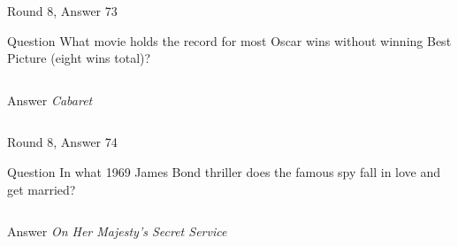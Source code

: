 \documentclass[11pt]{beamer}
\begin{document}
\begin{frame}[t]{Round 8, Answer 73}
\vspace{2em}
\begin{block}{Question}
What movie holds the record for most Oscar wins without winning Best Picture (eight wins total)?
\end{block}
\pause{}
\begin{columns}[T,totalwidth=\linewidth]
\begin{column}{0.35\linewidth}
\begin{block}{Answer}
\emph{Cabaret}
\end{block}
\end{column}
\begin{column}{0.6\linewidth}
\begin{center}
\texttt{[image: \{Images/cabaret]}.jpg}
\end{center}
\end{column}
\end{columns}
\end{frame}
    

\begin{frame}[t]{Round 8, Answer 74}
\vspace{2em}
\begin{block}{Question}
In what 1969 James Bond thriller does the famous spy fall in love and get married?
\end{block}
\pause{}
\begin{columns}[T,totalwidth=\linewidth]
\begin{column}{0.35\linewidth}
\begin{block}{Answer}
\emph{On Her Majesty's Secret Service}
\end{block}
\end{column}
\begin{column}{0.6\linewidth}
\begin{center}
\texttt{[image: \{Images/onhermajesty]}.jpg}
\end{center}
\end{column}
\end{columns}
\end{frame}
    
\end{document}
